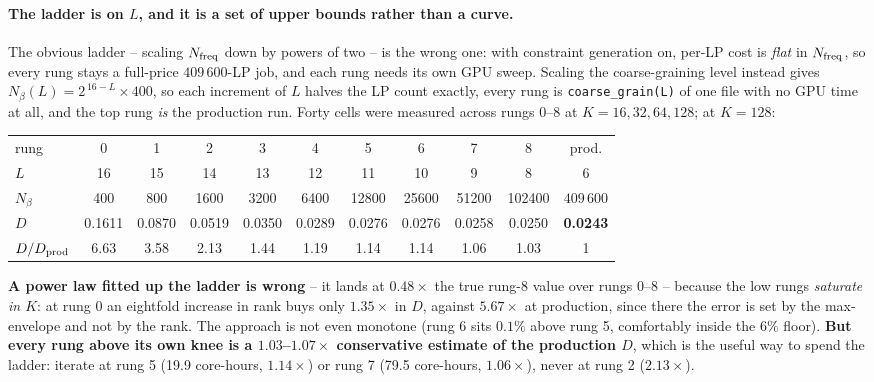 \documentclass{article}
\numberwithin{equation}{section}   %
\begin{document}
\paragraph{The ladder is on $L$, and it is a set of upper bounds rather than a curve.}
The obvious ladder -- scaling $N_{\rm freq}$ down by powers of two -- is the wrong one: with
constraint generation on, per-LP cost is {\em flat} in $N_{\rm freq}$, so every rung stays a
full-price $409\,600$-LP job, and each rung needs its own GPU sweep. Scaling the
coarse-graining level instead gives $N_\beta(L) = 2^{\,16-L} \times 400$, so each increment of
$L$ halves the LP count exactly, every rung is {\tt coarse\_grain(L)} of one file with no GPU
time at all, and the top rung {\em is} the production run. Forty cells were measured across
rungs 0--8 at $K = 16, 32, 64, 128$; at $K = 128$:

\begin{center}
\small
\begin{tabular}{lccccccccc|c}
\toprule
rung          & 0 & 1 & 2 & 3 & 4 & 5 & 6 & 7 & 8 & prod. \\
$L$           & 16 & 15 & 14 & 13 & 12 & 11 & 10 & 9 & 8 & 6 \\
$N_\beta$     & 400 & 800 & 1600 & 3200 & 6400 & 12800 & 25600 & 51200 & 102400 & $409\,600$ \\
\midrule
$D$           & 0.1611 & 0.0870 & 0.0519 & 0.0350 & 0.0289 & 0.0276 & 0.0276 & 0.0258 & 0.0250 & {\bf 0.0243} \\
$D/D_{\rm prod}$ & 6.63 & 3.58 & 2.13 & 1.44 & 1.19 & 1.14 & 1.14 & 1.06 & 1.03 & 1 \\
\bottomrule
\end{tabular}
\end{center}

\par\noindent
{\bf A power law fitted up the ladder is wrong} -- it lands at $0.48\times$ the true rung-8
value over rungs 0--8 -- because the low rungs {\em saturate in $K$}: at rung 0 an eightfold
increase in rank buys only $1.35\times$ in $D$, against $5.67\times$ at production, since there
the error is set by the max-envelope and not by the rank. The approach is not even monotone
(rung 6 sits $0.1\%$ above rung 5, comfortably inside the $6\%$ floor). {\bf But every rung
above its own knee is a $1.03$--$1.07\times$ conservative estimate of the production $D$},
which is the useful way to spend the ladder: iterate at rung 5 (19.9 core-hours, $1.14\times$)
or rung 7 (79.5 core-hours, $1.06\times$), never at rung 2 ($2.13\times$).
\end{document}

